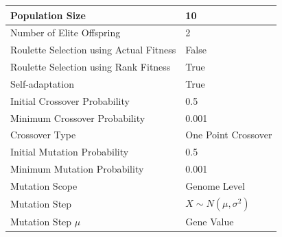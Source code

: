 \documentclass[a4paper,10pt]{article}
\begin{document}
\begin{table}[H]
\centering
\footnotesize
\begin{tabular}{ |>{\columncolor[gray]{0.8}} l | l| }
\hline
Population Size                                                      & 10                                                                           \\ \hline
Number of Elite Offspring                                            & 2                                                                            \\ \hline
Roulette Selection using Actual Fitness                              & False                                                                        \\ \hline
Roulette Selection using Rank Fitness                                & True                                                                         \\ \hline
Self-adaptation                                                      & True                                                                         \\ \hline
Initial Crossover Probability                                        & 0.5                                                                          \\ \hline
Minimum Crossover Probability                                        & 0.001                                                                        \\ \hline
Crossover Type                                                       & One Point Crossover                                                          \\ \hline
Initial Mutation Probability                                         & 0.5                                                                          \\ \hline
Minimum Mutation Probability                                         & 0.001                                                                        \\ \hline
Mutation Scope                                                       & Genome Level                                                                 \\ \hline
Mutation Step                                                        & $X\sim N(\mu,\sigma^2)$                                                      \\ \hline
Mutation Step $\mu$                                                  & Gene Value                                                                   \\ \hline

\end{tabular}
\end{table}
\end{document}
